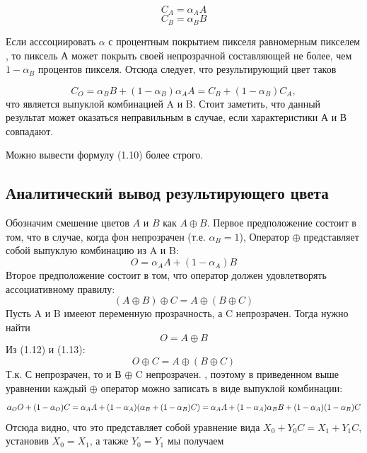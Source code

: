 \begin{equation}
C_{A} = \alpha_{A}A 
\end{equation}
\begin{equation}
C_{B} = \alpha_{B}B
\end{equation}

Если асссоциировать $\alpha$ с процентным покрытием пикселя равномерным пикселем \cite{bib1}, то пиксель А может покрыть своей непрозрачной составляющей не более, чем $1- \alpha_{B}$ процентов пикселя.  Отсюда следует, что результирующий цвет таков

\begin{equation}
C_{O} = \alpha_{B}B + (1- \alpha_{B})\alpha_{A}A = C_{B} + (1- \alpha_{B})C_{A},
\end{equation}
что является выпуклой комбинацией A и B.
Стоит заметить, что данный результат может оказаться неправильным в случае, если характеристики  А и В совпадают.  

Можно вывести формулу (1.10) более строго. 

\subsection{Аналитический вывод результирующего цвета}
Обозначим смешение цветов $A$ и $B$ как $A \oplus B$. 
Первое предположение состоит в том, что в случае, когда фон непрозрачен (т.е. $\alpha _ {B} = 1$), Оператор $\oplus$ представляет собой выпуклую комбинацию из A и B:
\begin{equation}
O= \alpha_{A}A + (1- \alpha_{A})B
\end{equation}
Второе предположение состоит в том, что оператор должен удовлетворять ассоциативному правилу:
\begin{equation}
(A \oplus B) \oplus C = A \oplus (B \oplus C)
\end{equation}
Пусть A и B имееют переменную прозрачность, а C непрозрачен. Тогда нужно найти
\begin{equation}
O = A \oplus B
\end{equation}
Из (1.12) и (1.13):
\begin{equation}
O \oplus C = A \oplus (B \oplus C)
\end{equation}
Т.к. С непрозрачен, то и В $\oplus$ C непрозрачен. , поэтому в приведенном выше уравнении каждый  $\oplus$ оператор можно записать в виде выпуклой комбинации:
\begin{equation}
\alpha_{O}O + (1 - \alpha_{O}) C = \alpha_{A}A + (1 - \alpha_{A})(\alpha_{B} + (1 - \alpha_{B})C) \\
= \alpha_{A}A + (1 - \alpha_{A})\alpha_{B}B + (1-\alpha_{A})(1-\alpha_{B})C
\end{equation}
Отсюда видно, что это представляет собой уравнение вида $ X_{0} + Y_{0} C = X_{1} + Y_{1} C$, установив  $X_{0} = X_{1}$, а также $Y_{0} = Y_ {1}$ мы получаем

